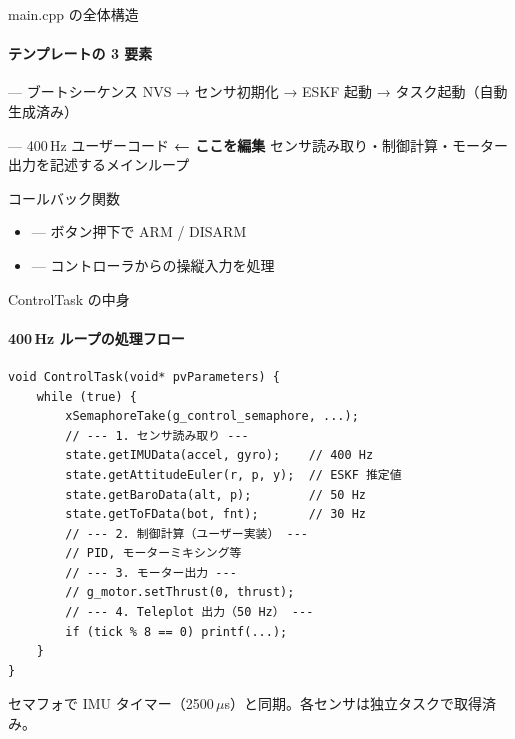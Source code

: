 \documentclass[aspectratio=169, 14pt]{beamer}
\begin{document}
\begin{frame}{main.cpp の全体構造}
  \framesubtitle{テンプレートの 3 要素}

  \begin{block}{ — ブートシーケンス}
    {\small NVS → センサ初期化 → ESKF 起動 → タスク起動（自動生成済み）}
  \end{block}

  \vspace{0.3em}

  \begin{alertblock}{ — 400\,Hz ユーザーコード \textbf{← ここを編集}}
    {\small センサ読み取り・制御計算・モーター出力を記述するメインループ}
  \end{alertblock}

  \vspace{0.3em}

  \begin{exampleblock}{コールバック関数}
    {\small
    \begin{itemize}
      \item {} — ボタン押下で ARM / DISARM
      \item {} — コントローラからの操縦入力を処理
    \end{itemize}
    }
  \end{exampleblock}
\end{frame}

\begin{frame}[fragile]{ControlTask の中身}
  \framesubtitle{400\,Hz ループの処理フロー}
  \begin{lstlisting}[style=sfcpp, basicstyle=\ttfamily\scriptsize]
void ControlTask(void* pvParameters) {
    while (true) {
        xSemaphoreTake(g_control_semaphore, ...);
        // --- 1. センサ読み取り ---
        state.getIMUData(accel, gyro);    // 400 Hz
        state.getAttitudeEuler(r, p, y);  // ESKF 推定値
        state.getBaroData(alt, p);        // 50 Hz
        state.getToFData(bot, fnt);       // 30 Hz
        // --- 2. 制御計算（ユーザー実装） ---
        // PID, モーターミキシング等
        // --- 3. モーター出力 ---
        // g_motor.setThrust(0, thrust);
        // --- 4. Teleplot 出力（50 Hz） ---
        if (tick % 8 == 0) printf(...);
    }
}
  \end{lstlisting}

  {\footnotesize
    セマフォで IMU タイマー（2500\,$\mu$s）と同期。各センサは独立タスクで取得済み。
  }
\end{frame}
\end{document}
